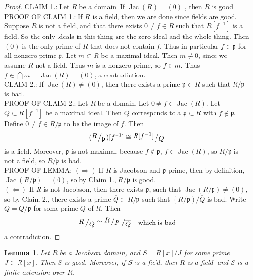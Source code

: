 \documentclass[12pt]{article}
\DeclareMathOperator{\Jac}{Jac}
\newcommand{\bigslant}[2]{{\raisebox{.2em}{$#1$}\left/\raisebox{-.2em}{$#2$}\right.}}
\def\p{\mathfrak{p}}
\newtheorem{lemma}[theorem]{Lemma}
\theoremstyle{definition}
\begin{document}
\begin{proof}
CLAIM 1.: Let $R$ be a domain. If $\Jac (R) = (0)$ , then $R$ is good.\\
PROOF OF CLAIM 1.: If $R$ is a field, then we are done since fields are good. Suppose $R$ is not a field, and that there exists $0\neq f \in R$ such that $R[f^{-1}]$ is a field. So the only ideals in this thing are the zero ideal and the whole thing. Then $(0)$ is the only prime of $R$ that does not contain $f$. Thus in particular $f\in \p$ for all nonzero prime $\p$. Let $m\subset R$ be a maximal ideal. Then $m\neq 0$, since we assume $R $ not a field. Thus $m$ is a nonzero prime, so $f\in m$. Thus $f\in \bigcap m = \Jac (R) = (0)$, a contradiction.  \\
CLAIM 2.: If $\Jac(R) \neq (0)$, then there exists a prime $\p \subset R$ such that $R/\p$ is bad.\\
PROOF OF CLAIM 2.: Let $R$ be a domain. Let $0\neq f \in \Jac(R)$. Let $Q \subset R[f^{-1}]$ be a maximal ideal. Then $Q$ corresponds to a $\p \subset R$ with $f\notin \p$. Define $0\neq \overline{f} \in R/\p$ to be the image of $f$. Then
\[
(\bigslant{R}{\p})[f^{-1}] \cong \bigslant{R[f^{-1}]}{Q}
\]
is a field. Moreover, $\p$ is not maximal, because $f\notin \p$, $f\in \Jac(R)$, so $R/\p$ is not a field, so $R/\p$ is bad.\\
PROOF OF LEMMA: $(\Rightarrow)$ If $R$ is Jacobson and $\p $ prime, then by definition, $\Jac(R/\p) = (0)$, so by Claim 1., $R/\p$ is good.\\
$(\Leftarrow)$ If $R$ is not Jacobson, then there exists $\p$, such that $\Jac(R/\p) \neq (0)$, so by Claim 2., there exists a prime $\overline{Q} \subset R/\p$ such that $(R/\p)/\overline{Q}$ is bad. Write $\overline{Q} = Q/\p$ for some prime $Q$ of $R$. Then 
\[
\bigslant{R}{Q} \cong \bigslant{\bigslant{R}{P}}{\overline{Q}} \quad \text{which is bad}
\]
a contradiction.
\end{proof}
\begin{lemma}
Let $R$ be a Jacobson domain, and $S = R[x]/J$ for some prime $J\subset R[x]$. Then $S$ is good. Moreover, if $S$ is a field, then $R$ is a field, and $S$ is a finite extension over $R$.
\end{lemma}
\end{document}
